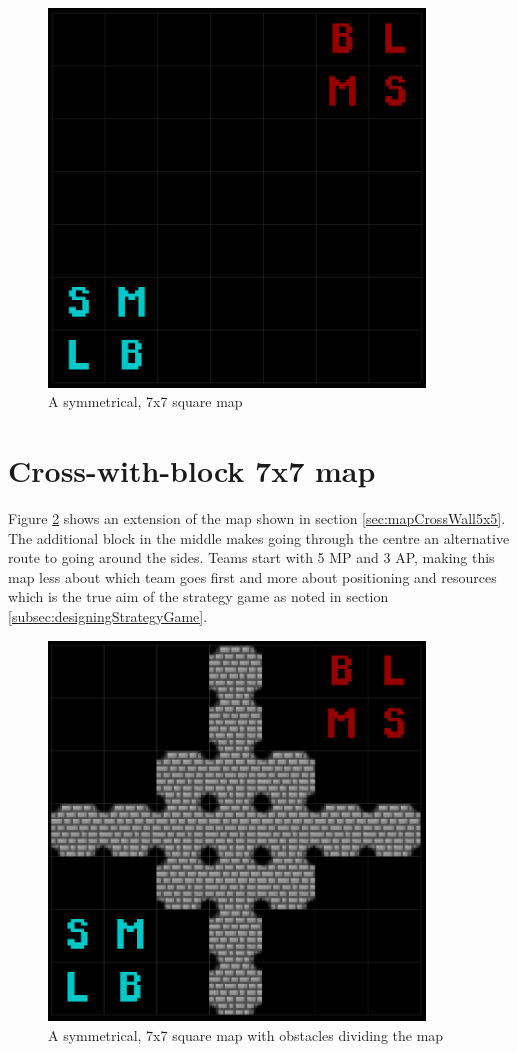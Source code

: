 \documentclass[11pt, a4paper]{report}
\begin{document}
\begin{appendices}
\begin{figure}[!h]
  \centering
  \includegraphics[width=10cm]{img/map_default_7x7.png}
  \caption{A symmetrical, 7x7 square map}
  \label{fig:mapDefault7x7}
\end{figure}

\pagebreak
\section{Cross-with-block 7x7 map}
\label{sec:mapCrossWithBlock7x7}

Figure \ref{fig:mapCrossWithBlock7x7} shows an extension of the map shown in section \ref{sec:mapCrossWall5x5}. The additional block in the middle makes going through the centre an alternative route to going around the sides. Teams start with 5 MP and 3 AP, making this map less about which team goes first and more about positioning and resources which is the true aim of the strategy game as noted in section \ref{subsec:designingStrategyGame}.

\begin{figure}[!h]
  \centering
  \includegraphics[width=10cm]{img/map_cross_with_block_7x7.png}
  \caption{A symmetrical, 7x7 square map with obstacles dividing the map}
  \label{fig:mapCrossWithBlock7x7}
\end{figure}


\end{appendices}
\end{document}
